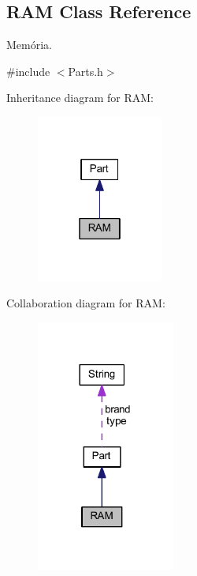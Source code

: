 \hypertarget{class_r_a_m}{}\subsection{R\+AM Class Reference}
\label{class_r_a_m}


Memória.  




{\ttfamily \#include $<$Parts.\+h$>$}



Inheritance diagram for R\+AM\+:
\nopagebreak
\begin{figure}[H]
\begin{center}
\leavevmode
\includegraphics[width=118pt]{class_r_a_m__inherit__graph}
\end{center}
\end{figure}


Collaboration diagram for R\+AM\+:
\nopagebreak
\begin{figure}[H]
\begin{center}
\leavevmode
\includegraphics[width=129pt]{class_r_a_m__coll__graph}
\end{center}
\end{figure}
